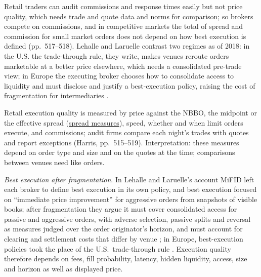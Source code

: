 \begin{qfdefinition}
Retail traders can audit commissions and response times easily but not price quality, which needs trade and quote data and norms for comparison; so brokers compete on commissions, and in competitive markets the total of spread and commission for small market orders does not depend on how best execution is defined (pp.~517--518). Lehalle and Laruelle contrast two regimes as of 2018: in the U.S. the trade-through rule, they write, makes venues reroute orders marketable at a better price elsewhere, which needs a consolidated pre-trade view; in Europe the executing broker chooses how to consolidate access to liquidity and must disclose and justify a best-execution policy, raising the cost of fragmentation for intermediaries \citep[sec.~3.4.2, p.~234]{alpha-laruelle}.

 Retail execution quality is measured by price against the NBBO, the midpoint or the effective spread (\hyperref[def:spread-measures]{spread measures}), speed, whether and when limit orders execute, and commissions; audit firms compare each night's trades with quotes and report exceptions (Harris, pp.~515--519). Interpretation: these measures depend on order type and size and on the quotes at the time; comparisons between venues need like orders.

\emph{Best execution after fragmentation}. In Lehalle and Laruelle's account MiFID left each broker to define best execution in its own policy, and best execution focused on ``immediate price improvement'' for aggressive orders from snapshots of visible books; after fragmentation they argue it must cover consolidated access for passive and aggressive orders, with adverse selection, passive splits and reversal as measures judged over the order originator's horizon, and must account for clearing and settlement costs that differ by venue \citep[Introduction, pp.~17--19]{alpha-laruelle}; in Europe, best-execution policies took the place of the U.S.\ trade-through rule \citep[chap.~1, sec.~1.1.2, p.~43]{alpha-laruelle}. Execution quality therefore depends on fees, fill probability, latency, hidden liquidity, access, size and horizon as well as displayed price.


\end{qfdefinition}
